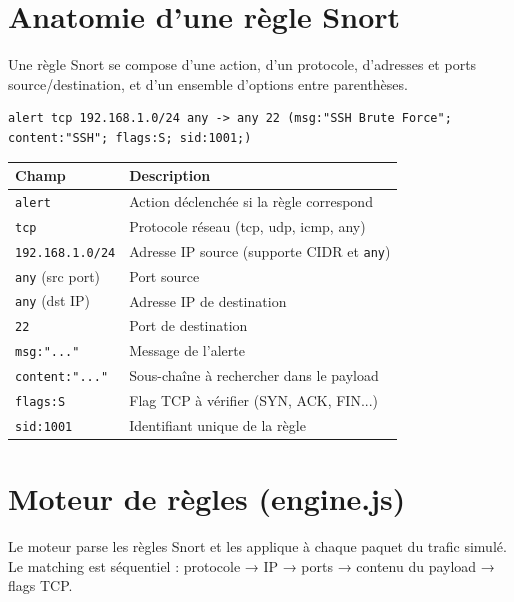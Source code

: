 \documentclass[12pt,a4paper]{report}
\newcommand{\code}[1]{\texttt{#1}}
\begin{document}
\section{Anatomie d'une règle Snort}

Une règle Snort se compose d'une action, d'un protocole, d'adresses et
ports source/destination, et d'un ensemble d'options entre parenthèses.

\begin{lstlisting}[numbers=none, caption={Format d'une règle Snort}]
alert tcp 192.168.1.0/24 any -> any 22 (msg:"SSH Brute Force"; content:"SSH"; flags:S; sid:1001;)
\end{lstlisting}

\begin{center}
\begin{tabular}{L{3cm} L{9.5cm}}
  \toprule
  \textbf{Champ} & \textbf{Description} \\
  \midrule
  \code{alert}           & Action déclenchée si la règle correspond \\
  \code{tcp}             & Protocole réseau (tcp, udp, icmp, any) \\
  \code{192.168.1.0/24}  & Adresse IP source (supporte CIDR et \code{any}) \\
  \code{any} (src port)  & Port source \\
  \code{any} (dst IP)    & Adresse IP de destination \\
  \code{22}              & Port de destination \\
  \code{msg:"..."}       & Message de l'alerte \\
  \code{content:"..."}   & Sous-chaîne à rechercher dans le payload \\
  \code{flags:S}         & Flag TCP à vérifier (SYN, ACK, FIN...) \\
  \code{sid:1001}        & Identifiant unique de la règle \\
  \bottomrule
\end{tabular}
\end{center}

\section{Moteur de règles (engine.js)}

Le moteur parse les règles Snort et les applique à chaque paquet du
trafic simulé. Le matching est séquentiel : protocole → IP → ports →
contenu du payload → flags TCP.
\end{document}
